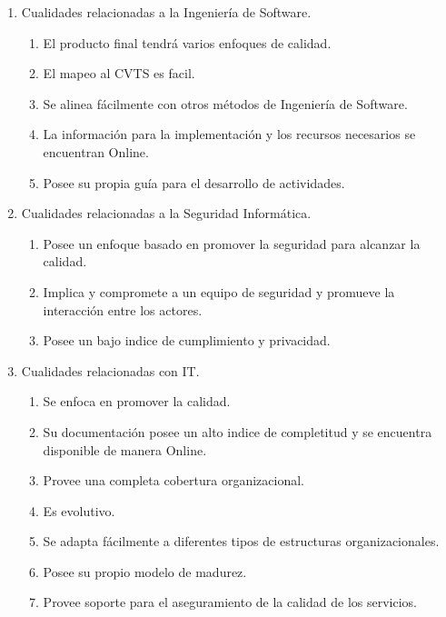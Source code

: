 \documentclass[runningheads,a4paper]{llncs}
\begin{document}
\begin{enumerate}
	\item Cualidades relacionadas a la Ingeniería de \gls{Software}.
		\begin{enumerate}
			\item El producto final tendrá varios enfoques de calidad.
			\item El mapeo al \gls{CVTS} es facil.
			\item Se alinea fácilmente con otros métodos de Ingeniería de \gls{Software}.
			\item La información para la implementación y los recursos necesarios se encuentran \gls{Online}.
			\item Posee su propia guía para el desarrollo de actividades.\\
			
		\end{enumerate}
	\item Cualidades relacionadas a la Seguridad Informática.
		\begin{enumerate}
			\item Posee un enfoque basado en promover la seguridad para alcanzar la calidad.
			\item Implica y compromete a un equipo de seguridad y promueve la interacción entre los actores.
			\item Posee un bajo indice de cumplimiento y privacidad.\\
			
		\end{enumerate}
	\item Cualidades relacionadas con \gls{IT}.
		\begin{enumerate}
			\item Se enfoca en promover la calidad.
			\item Su documentación posee un alto indice de completitud y se encuentra disponible de manera \gls{Online}.
			\item Provee una completa cobertura organizacional.
			\item Es evolutivo.
			\item Se adapta fácilmente a diferentes tipos de estructuras organizacionales.
			\item Posee su propio modelo de madurez.
			\item Provee soporte para el aseguramiento de la calidad de los servicios.\\
		\end{enumerate}
\end{enumerate}
\end{document}
